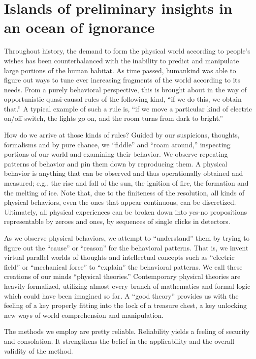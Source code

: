 \documentclass[rmp,amsfonts,showpacs,showkeys]{revtex4}
\begin{document}
\section{Islands of preliminary insights in an ocean of ignorance}

Throughout history, the demand to form the physical world according to people's wishes
has been counterbalanced with the inability to predict and manipulate
large portions of the human habitat.
As time passed, humankind was able to figure out ways to tune
ever increasing fragments of the world according to its needs.
From a purely behavioral perspective, this is brought about in the way of
opportunistic quasi-causal rules of the following kind,
``if we do this, we obtain that.''
A typical example of such a rule is, ``if we move a particular kind of  electric on/off switch,
the lights go on, and the room turns from dark to bright.''


How do we arrive at those kinds of rules?
Guided by our suspicions, thoughts, formalisms and by pure chance,
we ``fiddle'' and ``roam around,'' inspecting portions of our world
and examining their behavior.
We observe repeating patterns of behavior and pin them down by reproducing them.
A physical behavior is anything that can be observed and thus operationally obtained and measured;
e.g.,
the rise and fall of the sun, the ignition of fire, the formation and the melting of ice.
Note that, due to the finiteness of the resolution, all kinds of physical behaviors,
even the ones that appear continuous, can be discretized.
Ultimately, all physical experiences can be broken down into yes-no propositions
representable by zeroes and ones, by sequences of single clicks in detectors.


As we observe physical behaviors,
we attempt to ``understand'' them by trying to figure out
the ``cause'' \cite{frank} or ``reason'' for the behavioral  patterns.
That is, we invent virtual parallel worlds of thoughts
and intellectual concepts such as ``electric field'' or ``mechanical force''
to ``explain'' the behavioral patterns.
We call these creations of our minds ``physical theories.''
Contemporary physical theories are heavily formalized,
utilizing almost every branch of mathematics and formal logic
which could have been imagined so far.
A ``good theory'' provides us with the feeling of a key properly fitting into the lock of a treasure chest,
a key unlocking new ways of world comprehension and manipulation.

The methods we employ are pretty reliable.
Reliability yields a feeling of security and consolation.
It strengthens the belief in the applicability and the overall validity of the method.
\end{document}
